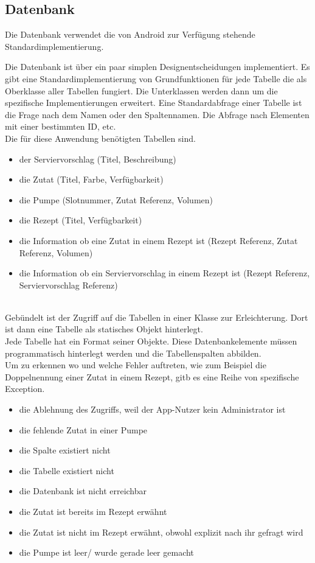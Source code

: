 \subsection{Datenbank}

Die Datenbank verwendet die von Android zur Verfügung stehende Standardimplementierung. 
 
Die Datenbank ist über ein paar simplen Designentscheidungen implementiert. Es gibt eine Standardimplementierung von Grundfunktionen für jede Tabelle die als Oberklasse aller Tabellen fungiert. Die Unterklassen werden dann um die spezifische Implementierungen erweitert. Eine Standardabfrage einer Tabelle ist die Frage nach dem Namen oder den Spaltennamen. Die Abfrage nach Elementen mit einer bestimmten ID, etc. 
\\
Die für diese Anwendung benötigten Tabellen sind. 
\begin{itemize}
	\item der Serviervorschlag (Titel, Beschreibung)
	\item die Zutat (Titel, Farbe, Verfügbarkeit)
	\item die Pumpe (Slotnummer, Zutat Referenz, Volumen)
	\item die Rezept (Titel, Verfügbarkeit)
	\item die Information ob eine Zutat in einem Rezept ist (Rezept Referenz, Zutat Referenz, Volumen)
	\item die Information ob ein Serviervorschlag in einem Rezept ist (Rezept Referenz, Serviervorschlag Referenz)
\end{itemize}
\\
Gebündelt ist der Zugriff auf die Tabellen in einer Klasse zur Erleichterung. 
Dort ist dann eine Tabelle als statisches Objekt hinterlegt. 
\\
Jede Tabelle hat ein Format seiner Objekte. Diese Datenbankelemente müssen programmatisch hinterlegt werden und die Tabellenspalten abbilden. 
\\
Um zu erkennen wo und welche Fehler auftreten, wie zum Beispiel die Doppelnennung einer Zutat in einem Rezept, gitb es eine Reihe von spezifische Exception. 
\begin{itemize}
 	\item die Ablehnung des Zugriffs, weil der App-Nutzer kein Administrator ist
 	\item die fehlende Zutat in einer Pumpe
 	\item die Spalte existiert nicht
 	\item die Tabelle existiert nicht
 	\item die Datenbank ist nicht erreichbar
 	\item die Zutat ist bereits im Rezept erwähnt
 	\item die Zutat ist nicht im Rezept erwähnt, obwohl explizit nach ihr gefragt wird
 	\item die Pumpe ist leer/ wurde gerade leer gemacht
\end{itemize}
\\

